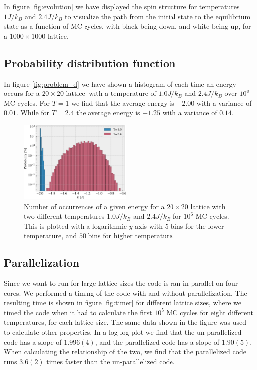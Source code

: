 \documentclass[%
 reprint,
nofootinbib,
aps,
]{revtex4-1}
\begin{document}
In figure \vref{fig:evolution} we have displayed the spin structure for temperatures $1J/k_B$ and $2.4J/k_B$ to visualize the path from the initial state to the equilibrium state as a function of MC cycles, with black being down, and white being up, for a $1000\times 1000$ lattice.

\subsection{Probability distribution function}
In figure \vref{fig:problem_d} we have shown a histogram of each time an energy occurs for a $20\times 20$ lattice, with a temperature of $1.0J/k_B$ and $2.4J/k_B$ over $10^6$ MC cycles. For $T=1$ we find that the average energy is $-2.00$ with a variance of $0.01$. While for $T=2.4$ the average energy is $-1.25$ with a variance of $0.14$.

\begin{figure}
  \includegraphics[width=0.485\textwidth]{../figures/problem_d.pdf}
  \caption{Number of occurrences of a given energy for a $20\times 20$ lattice with two different temperatures $1.0J/k_B$ and $2.4J/k_B$ for $10^6$ MC cycles. This is plotted with a logarithmic $y$-axis with $5$ bins for the lower temperature, and $50$ bins for higher temperature.}
  \label{fig:problem_d}
\end{figure}

\subsection{Parallelization}
Since we want to run for large lattice sizes the code is ran in parallel on four cores. We performed a timing of the code with and without parallelization. The resulting time is shown in figure \vref{fig:timer} for different lattice sizes, where we timed the code when it had to calculate the first $10^5$ MC cycles for eight different temperatures, for each lattice size. The same data shown in the figure was used to calculate other properties. In a log-log plot we find that the un-parallelized code has a slope of $1.996(4)$, and the parallelized code has a slope of $1.90(5)$. When calculating the relationship of the two, we find that the parallelized code runs $3.6(2)$ times faster than the un-parallelized code.
\end{document}
